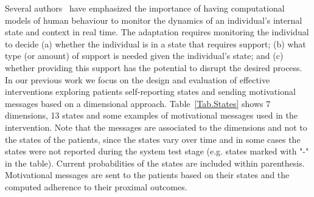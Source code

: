 \documentclass{llncs}
\begin{document}
Several authors~\cite{Murray2016, Nahum-Shani, MacPhail} have emphasized the importance of having computational models of human behaviour to monitor the dynamics of an individual's internal state and context in real time. The adaptation requires monitoring the individual to decide (a) whether the individual is in a state that requires support; (b) what type (or amount) of support is needed given the individual's state; and (c) whether providing this support has the potential to disrupt the desired process. In our previous work we focus on the design and evaluation of effective interventions exploring patients self-reporting states and sending motivational messages based on a dimensional approach. Table~\ref{Tab.States} shows 7 dimensions, 13 states and some examples of motivational messages used in the intervention. Note that the messages are associated to the dimensions and not to the states of the patients, since the states vary over time and in some cases the states were not reported during the system test stage (e.g. states marked with "-" in the table). Current probabilities of the states are included within parenthesis. Motivational messages are sent to the patients based on their states and the computed adherence to their proximal outcomes.
\end{document}

